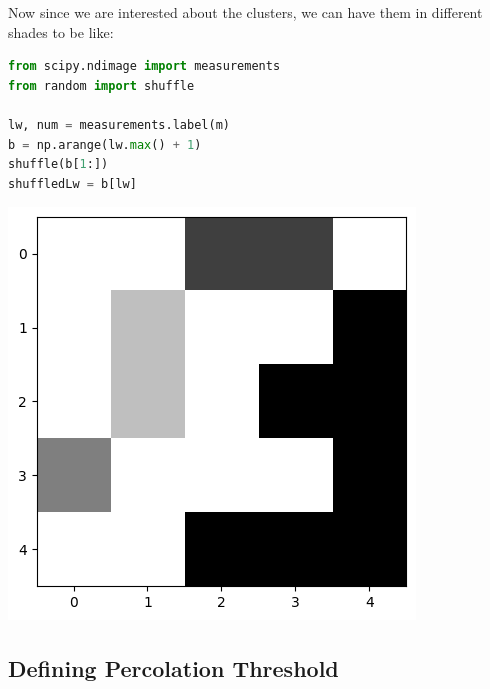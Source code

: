 \documentclass[compress]{beamer}
\newcommand{\imp}[1]{\textcolor{NordRed}{#1}}
\begin{document}
\begin{frame}[fragile]
    Now since we are interested about the \imp{clusters}, we can have them in different
    shades to be like:

    \begin{minipage}{.63\linewidth}
        \begin{lstlisting}[language=python]
from scipy.ndimage import measurements
from random import shuffle

lw, num = measurements.label(m)
b = np.arange(lw.max() + 1)
shuffle(b[1:])
shuffledLw = b[lw]
        \end{lstlisting}
    \end{minipage}\hfill%
    \begin{minipage}{.35\linewidth}
        \begin{center}
        \includegraphics[width=\linewidth]{cluster.png}
        \end{center}
    \end{minipage}

\end{frame}

\subsection{Defining Percolation Threshold}
\end{document}
